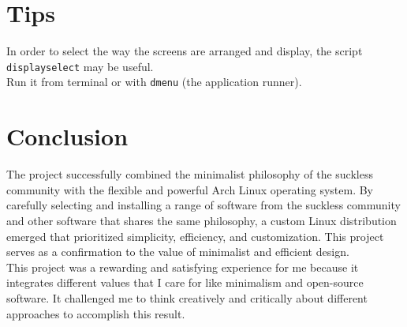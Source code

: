 \documentclass[11pt]{article}
\begin{document}
\section{Tips}

In order to select the way the screens are arranged and display,
the script \texttt{displayselect} may be useful.\\
Run it from terminal or with \texttt{dmenu} (the application runner).

\section{Conclusion}
The project successfully combined the minimalist philosophy of the suckless community with the flexible and powerful Arch
Linux operating system. By carefully selecting and installing a range of software from the suckless community and other software that shares the same philosophy, a custom Linux distribution emerged that prioritized simplicity, efficiency, and customization. This project serves as a confirmation to the value of minimalist and efficient design.\\
\newline
This project was a rewarding and satisfying experience for me because it\\
integrates different values that I care for like minimalism and open-source\\
software. It challenged me to think creatively and critically about different approaches to accomplish this result.
\end{document}

